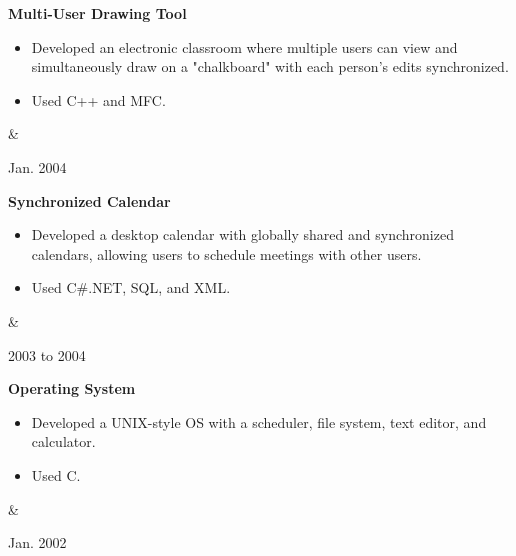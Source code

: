 \documentclass[10pt, letterpaper]{article}
\newenvironment{highlights}{
        \begin{itemize}[
                topsep=0pt,
                parsep=0.10 cm,
                partopsep=0pt,
                itemsep=0pt,
                after=\vspace{-1\baselineskip},
                leftmargin=0.4 cm + 3pt
            ]
    }{
        \end{itemize}
    } %
\let\originalTabularx\tabularx
\let\originalEndTabularx\endtabularx
\renewenvironment{tabularx}{\bgroup\centering\originalTabularx}{\originalEndTabularx\par\egroup}
\begin{document}
        \begin{tabularx}{
            \textwidth-0.4 cm-0.13cm
        }{
            K{0.2 cm}
            R{4.1 cm}
        }
            \textbf{Multi-User Drawing Tool}

            \vspace{0.10 cm}

            \begin{highlights}
                \item Developed an electronic classroom where multiple users can view and simultaneously draw on a "chalkboard" with each person's edits synchronized.
                \item Used C++ and MFC.
            \end{highlights}
            &
            

            Jan. 2004
        \end{tabularx}


        \vspace{0.2 cm}
        \begin{tabularx}{
            \textwidth-0.4 cm-0.13cm
        }{
            K{0.2 cm}
            R{4.1 cm}
        }
            \textbf{Synchronized Calendar}

            \vspace{0.10 cm}

            \begin{highlights}
                \item Developed a desktop calendar with globally shared and synchronized calendars, allowing users to schedule meetings with other users.
                \item Used C\#.NET, SQL, and XML.
            \end{highlights}
            &
            

            2003 to 2004
        \end{tabularx}


        \vspace{0.2 cm}
        \begin{tabularx}{
            \textwidth-0.4 cm-0.13cm
        }{
            K{0.2 cm}
            R{4.1 cm}
        }
            \textbf{Operating System}

            \vspace{0.10 cm}

            \begin{highlights}
                \item Developed a UNIX-style OS with a scheduler, file system, text editor, and calculator.
                \item Used C.
            \end{highlights}
            &
            

            Jan. 2002
        \end{tabularx}
\end{document}
